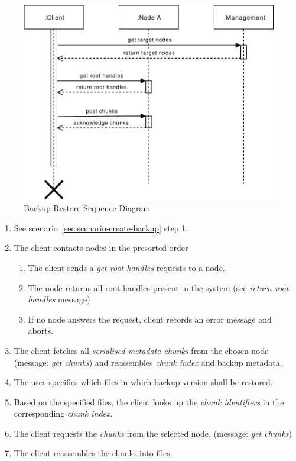 \begin{figure}[h]
    \centering
    \includegraphics[width=\linewidth]{resources/backup_restore.pdf}
    \caption{Backup Restore Sequence Diagram}
    \label{fig:backup-restore}
\end{figure}

\begin{enumerate}
    \item See scenario~\ref{sec:scenario-create-backup} step 1.
    \item The client contacts nodes in the presorted order
        \begin{enumerate}
            \item The client sends a \emph{get root handles} requests to a node.
            \item The node returns all root handles present in the system (see \emph{return root handles} message)
            \item If no node answers the request, client records an error message and aborts.
        \end{enumerate}
    \item The client fetches all \emph{serialised metadata chunks} from the chosen node (message: \emph{get chunks}) and reassembles \emph{chunk index} and backup metadata.
    \item The user specifies which files in which backup version shall be restored. %
    \item Based on the specified files, the client looks up the \emph{chunk identifiers} in the corresponding \emph{chunk index}.
    \item The client requests the \emph{chunks} from the selected node. (message: \emph{get chunks})
    \item The client reassembles the chunks into files.
\end{enumerate}

